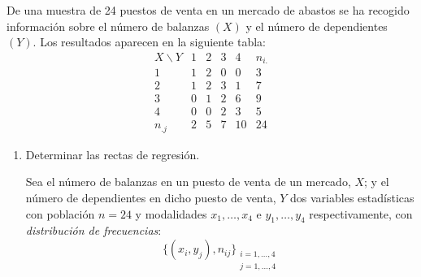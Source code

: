 \begin{ejercicio}
    De una muestra de 24 puestos de venta en un mercado de abastos se ha recogido información sobre el número de balanzas $(X)$ y el número de dependientes $(Y)$. Los resultados aparecen en la siguiente tabla:
    \begin{equation*}
        \begin{array}{c|cccc|c}
            X\backslash Y & 1 & 2 & 3 & 4 & n_{i.}\\ \hline
            1 & 1 & 2 & 0 & 0 & 3\\
            2 & 1 & 2 & 3 & 1 & 7\\
            3 & 0 & 1 & 2 & 6 & 9\\
            4 & 0 & 0 & 2 & 3 & 5\\ \hline
            n_{.j} & 2 & 5 & 7 & 10 & 24
        \end{array}
    \end{equation*}
    \begin{enumerate}
        \item Determinar las rectas de regresión.
        
        Sea el número de balanzas en un puesto de venta de un mercado, $X$; y el número de dependientes en dicho puesto de venta, $Y$ dos variables estadísticas con población $n=24$ y modalidades $x_1,\dots,x_4$ e $y_1,\dots, y_4$ respectivamente, con \emph{distribución de frecuencias}:
            $$\{(x_i,y_j),n_{ij}\}_{\substack{i=1,\dots,4\\j=1,\dots,4}}$$


\end{enumerate}
\end{ejercicio}
